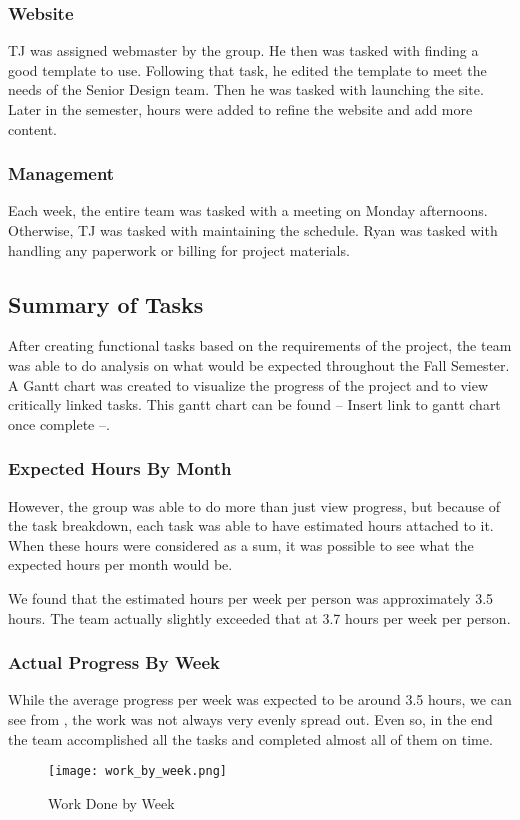 \documentclass[PPFS.tex]{template/subfiles}
\begin{document}
\subsubsection{Website}
TJ was assigned webmaster by the group. He then was tasked with finding a good template to use. Following that task, he edited the template to meet the needs of the Senior Design team. Then he was tasked with launching the site. Later in the semester, hours were added to refine the website and add more content.

\subsubsection{Management}
Each week, the entire team was tasked with a meeting on Monday afternoons. Otherwise, TJ was tasked with maintaining the schedule. Ryan was tasked with handling any paperwork or billing for project materials.


\subsection{Summary of Tasks}
After creating functional tasks based on the requirements of the project, the team was able to do analysis on what would be expected throughout the Fall Semester. A Gantt chart was created to visualize the progress of the project and to view critically linked tasks.
This gantt chart can be found -- Insert link to gantt chart once complete --.

\subsubsection{Expected Hours By Month}
However, the group was able to do more than just view progress, but because of the task breakdown, each task was able to have estimated hours attached to it. When these hours were considered as a sum, it was possible to see what the expected hours per month would be.

We found that the estimated hours per week per person was approximately 3.5 hours. The team actually slightly exceeded that at 3.7 hours per week per person.

\subsubsection{Actual Progress By Week}

While the average progress per week was expected to be around 3.5 hours, we can see from , the work was not always very evenly spread out. Even so, in the end the team accomplished all the tasks and completed almost all of them on time.

\begin{figure}[H]
    \centering
    \texttt{[image: work\_by\_week.png]}
    \caption{Work Done by Week}
    \label{fig:work_by_week}
\end{figure}
\end{document}
